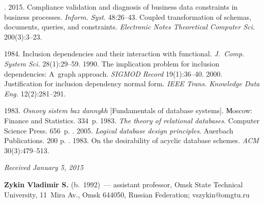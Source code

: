 




  \begin{multicols}{2}

\renewcommand{\bibname}{\protect\rmfamily References}

{\small\frenchspacing
 {%
 \begin{thebibliography}{9}
. 2015. Compliance
validation and diagnosis of business data constraints in business processes.
\textit{Inform. Syst.} 48:26--43.
 Coupled transformation of schemas, documents, queries, and
constraints. \textit{Electronic Notes Theoretical Computer Sci.} 200(3):3--23.

 1984. Inclusion dependencies and their interaction with
functional. \textit{J.~Comp. System Sci.} 28(1):29--59.
 1990. The implication problem for inclusion dependencies:
A~graph approach. \textit{SIGMOD Record} 19(1):36--40.
 2000. Justification for inclusion dependency normal form.
\textit{IEEE Trans. Knowledge Data Eng.} 12(2):281--291.

 1983. \textit{Osnovy sistem baz dannykh} [Fundamentals of
database systems]. Мoscow: Finance and Statistics. 334~p.
 1983.  \textit{The theory of
relational databases}. Computer Science Press. 656~p.
. 2005. \textit{Logical database design
principles}. Auerbach Publications. 200 p.
. 1983. On the desirability
of acyclic database schemes. \textit{ACM} 30(3):479--513.
\end{thebibliography}

 }
 }

\end{multicols}

\vspace*{-3pt}

\hfill{\small\textit{Received January 5, 2015}}


  \Contrl

  \noindent
  \textbf{Zykin Vladimir S.} (b.\ 1992)~---
  assistant professor, Omsk State Technical University, 11~Mira Av., Omsk 644050, Russian
Federation; vszykin@omgtu.ru


\label{end\stat}


\renewcommand{\bibname}{\protect\rm Литература}
